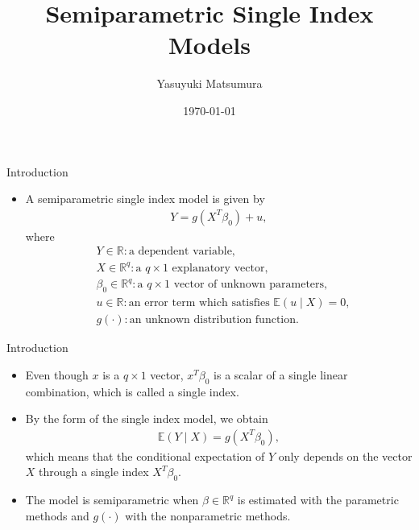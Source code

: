 \documentclass[xcolor=svgnames,dvipdfmx,cjk]{beamer}
\theoremstyle{example}
\begin{document}
 

\title[Li and Racine (2007, Chapter 8)]{Semiparametric Single Index Models} 
\author[Y. Matsumura]{Yasuyuki Matsumura}          
\date{\today}


\begin{frame}                  
\titlepage                     
\end{frame}




\begin{frame}{Introduction}
  \begin{itemize}
    \item  \alert{A semiparametric single index model} is given by 
            \begin{align*}
              Y = g (X^{T} \beta_0) + u,
            \end{align*}
           where  
            \begin{align*}
              & Y \in \mathbb{R}: \text{a dependent variable}, \\
              & X \in \mathbb{R}^{q}: \text{a }  q \times 1 \text{ explanatory vector}, \\
              & \beta_0 \in \mathbb{R}^{q}: \text{a }  q \times 1 \text{ vector of unknown parameters}, \\
              & u \in \mathbb{R}: \text{an error term which satisfies } \mathbb{E}(u \mid X) =0, \\
              & g(\cdot): \text{an unknown distribution function}.
            \end{align*}
  \end{itemize}
\end{frame}

\begin{frame}{Introduction}
  \begin{itemize}
    \item Even though $x$ is a $q\times1$ vector, 
          $x^{T} \beta_0$ is a scalar of a single linear combination, 
          which is called \alert{a single index}.
    \item By the form of the single index model, we obtain
          \begin{align*}
            \mathbb{E}(Y \mid X) = g(X^{T} \beta_0),
          \end{align*}
          which means that 
          the conditional expectation of $Y$ 
          only depends on the vector $X$
          through a single index $X^{T} \beta_0$.
    \item The model is semiparametric 
          when $\beta \in \mathbb{R}^{q}$ is estimated with the parametric methods
          and $g(\cdot)$ with the nonparametric methods.
  \end{itemize}
\end{frame}
\end{document}

